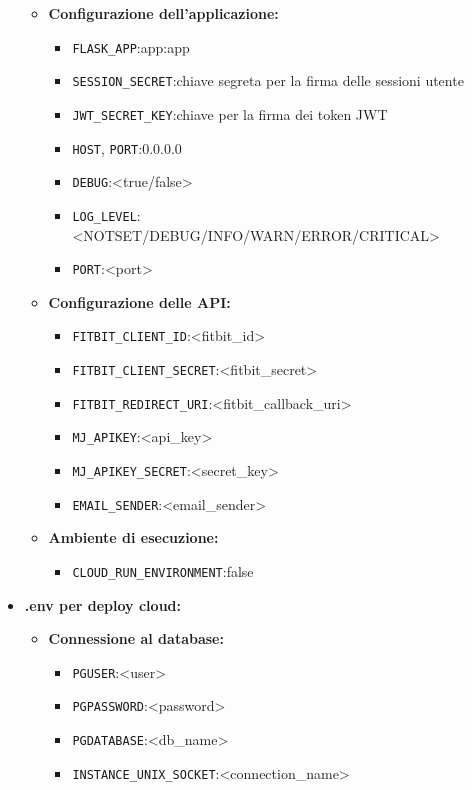\documentclass[12pt,a4paper,oneside]{report}
\begin{document}
\begin{itemize}
\begin{itemize}
              \item \textbf{Configurazione dell'applicazione:}
                    \begin{itemize}
                        \item \texttt{FLASK\_APP}:app:app
                        \item \texttt{SESSION\_SECRET}:chiave segreta per la firma delle sessioni utente
                        \item \texttt{JWT\_SECRET\_KEY}:chiave per la firma dei token JWT
                        \item \texttt{HOST}, \texttt{PORT}:0.0.0.0
                        \item \texttt{DEBUG}:<true/false>
                        \item \texttt{LOG\_LEVEL}:<NOTSET/DEBUG/INFO/WARN/ERROR/CRITICAL>
                        \item \texttt{PORT}:<port>
                    \end{itemize}
              \item \textbf{Configurazione delle API:}
                    \begin{itemize}
                        \item \texttt{FITBIT\_CLIENT\_ID}:<fitbit\_id>
                        \item \texttt{FITBIT\_CLIENT\_SECRET}:<fitbit\_secret>
                        \item \texttt{FITBIT\_REDIRECT\_URI}:<fitbit\_callback\_uri>
                        \item \texttt{MJ\_APIKEY}:<api\_key>
                        \item \texttt{MJ\_APIKEY\_SECRET}:<secret\_key>
                        \item \texttt{EMAIL\_SENDER}:<email\_sender>
                    \end{itemize}
              \item \textbf{Ambiente di esecuzione:}
                    \begin{itemize}
                        \item \texttt{CLOUD\_RUN\_ENVIRONMENT}:false
                    \end{itemize}
          \end{itemize}

    \item \textbf{.env per deploy cloud:}

          \begin{itemize}
              \item \textbf{Connessione al database:}
                    \begin{itemize}
                        \item \texttt{PGUSER}:<user>
                        \item \texttt{PGPASSWORD}:<password>
                        \item \texttt{PGDATABASE}:<db\_name>
                        \item \texttt{INSTANCE\_UNIX\_SOCKET}:<connection\_name>
                    \end{itemize}


\end{itemize}
\end{itemize}
\end{document}
